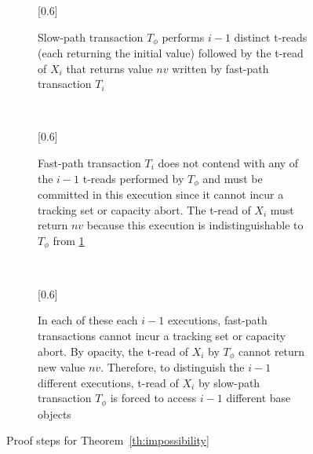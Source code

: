 \begin{figure*}[!t]
	\begin{center}
		\begin{subfigure}{\linewidth}{\scalebox{0.6}[0.6]{}}
			\caption{Slow-path transaction $T_{\phi}$ performs $i-1$ distinct t-reads (each returning the initial value) followed by the t-read of $X_i$ that returns value $nv$ 
				written by fast-path transaction $T_i$}\label{sfig:inv-1}
		\end{subfigure}
		\\
		\vspace{2mm}
		\begin{subfigure}{\linewidth}{\scalebox{0.6}[0.6]{}}
			\caption{Fast-path transaction $T_i$ does not contend with any of the $i-1$ t-reads performed by $T_{\phi}$ and must be committed in this execution since it cannot incur a tracking set or capacity abort.
				The t-read of $X_i$ must return $nv$ because this execution is indistinguishable to $T_{\phi}$ from \ref{sfig:inv-1}}
			\label{sfig:inv-2} 
		\end{subfigure}
		\\
		\vspace{2mm}
		\begin{subfigure}{\linewidth}{\scalebox{0.6}[0.6]{}}
			\caption{In each of these each $i-1$ executions, fast-path transactions cannot incur a tracking set or capacity abort. By opacity, the t-read of $X_i$ by $T_{\phi}$ cannot return new value $nv$.
				Therefore, to distinguish the $i-1$ different executions, t-read of $X_i$ by slow-path transaction $T_{\phi}$ is forced
				to access $i-1$ different base objects}
			\label{sfig:inv-3}
		\end{subfigure}
		\caption{Proof steps for Theorem~\ref{th:impossibility}
			\label{fig:indis}} 
	\end{center}
\end{figure*}
